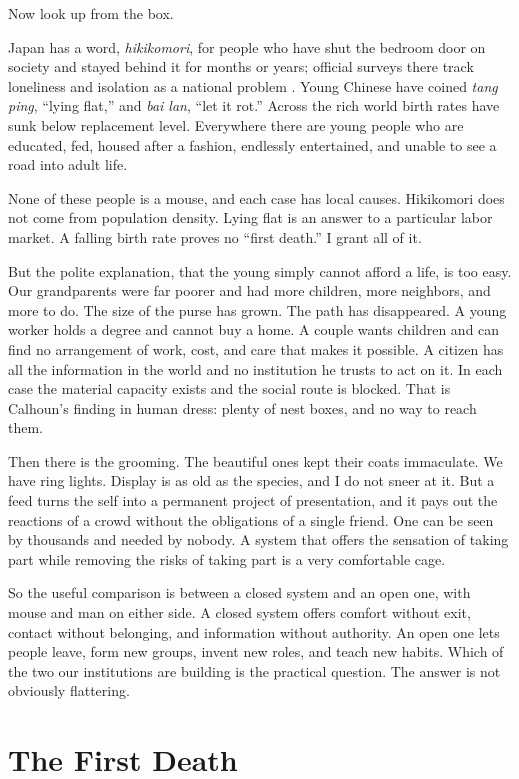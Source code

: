 \documentclass[12pt,a4paper]{book}
\begin{document}
Now look up from the box.

Japan has a word, \emph{hikikomori}, for people who have shut the bedroom door on society and stayed behind it for months or years; official surveys there track loneliness and isolation as a national problem \cite{cabinet2025}. Young Chinese have coined \emph{tang ping}, ``lying flat,'' and \emph{bai lan}, ``let it rot.'' Across the rich world birth rates have sunk below replacement level. Everywhere there are young people who are educated, fed, housed after a fashion, endlessly entertained, and unable to see a road into adult life.

None of these people is a mouse, and each case has local causes. Hikikomori does not come from population density. Lying flat is an answer to a particular labor market. A falling birth rate proves no ``first death.'' I grant all of it.

But the polite explanation, that the young simply cannot afford a life, is too easy. Our grandparents were far poorer and had more children, more neighbors, and more to do. The size of the purse has grown. The path has disappeared. A young worker holds a degree and cannot buy a home. A couple wants children and can find no arrangement of work, cost, and care that makes it possible. A citizen has all the information in the world and no institution he trusts to act on it. In each case the material capacity exists and the social route is blocked. That is Calhoun's finding in human dress: plenty of nest boxes, and no way to reach them.

Then there is the grooming. The beautiful ones kept their coats immaculate. We have ring lights. Display is as old as the species, and I do not sneer at it. But a feed turns the self into a permanent project of presentation, and it pays out the reactions of a crowd without the obligations of a single friend. One can be seen by thousands and needed by nobody. A system that offers the sensation of taking part while removing the risks of taking part is a very comfortable cage.

So the useful comparison is between a closed system and an open one, with mouse and man on either side. A closed system offers comfort without exit, contact without belonging, and information without authority. An open one lets people leave, form new groups, invent new roles, and teach new habits. Which of the two our institutions are building is the practical question. The answer is not obviously flattering.

\section{The First Death}
\end{document}
